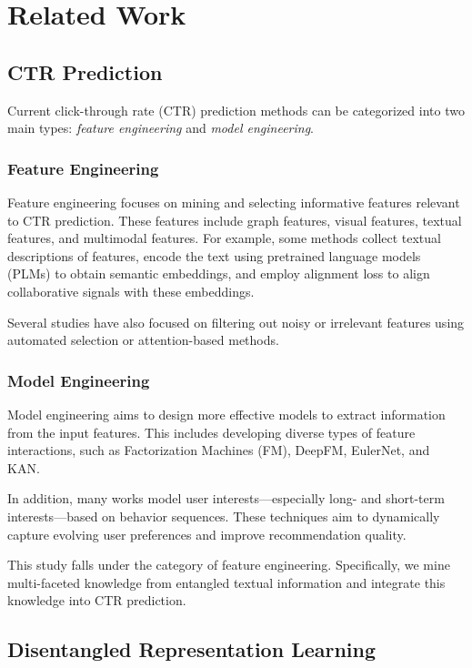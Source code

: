 \chapter{Related Work}

\section{CTR Prediction}

Current click-through rate (CTR) prediction methods can be categorized into two main types: \textit{feature engineering} and \textit{model engineering}.

\subsection{Feature Engineering}

Feature engineering focuses on mining and selecting informative features relevant to CTR prediction. These features include graph features, visual features, textual features, and multimodal features. For example, some methods collect textual descriptions of features, encode the text using pretrained language models (PLMs) to obtain semantic embeddings, and employ alignment loss to align collaborative signals with these embeddings.

Several studies have also focused on filtering out noisy or irrelevant features using automated selection or attention-based methods.

\subsection{Model Engineering}

Model engineering aims to design more effective models to extract information from the input features. This includes developing diverse types of feature interactions, such as Factorization Machines (FM), DeepFM, EulerNet, and KAN.

In addition, many works model user interests—especially long- and short-term interests—based on behavior sequences. These techniques aim to dynamically capture evolving user preferences and improve recommendation quality.

This study falls under the category of feature engineering. Specifically, we mine multi-faceted knowledge from entangled textual information and integrate this knowledge into CTR prediction.

\section{Disentangled Representation Learning}


